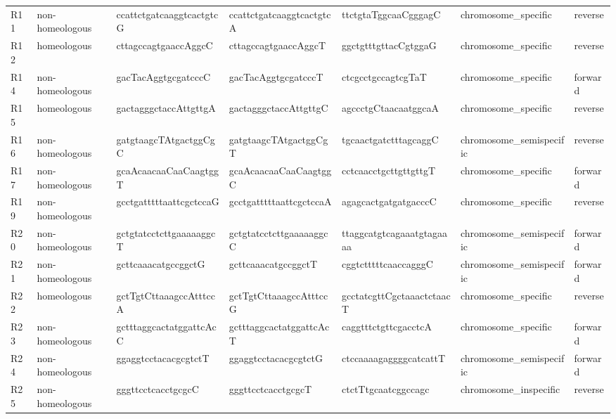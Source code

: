 \begin{sidewaystable}
\begin{localsize}{6}{9}
\begin{tabular}{lllllll}
 R11        & non-homeologous     & ccattctgatcaaggtcactgtcG    & ccattctgatcaaggtcactgtcA    & ttctgtaTggcaaCgggagC        & chromosome\_specific     & reverse       \\
 R12        & homeologous         & cttagccagtgaaccAggcC        & cttagccagtgaaccAggcT        & ggctgtttgttacCgtggaG        & chromosome\_specific     & reverse       \\
 R14        & non-homeologous     & gacTacAggtgcgatcccC         & gacTacAggtgcgatcccT         & ctcgcctgccagtcgTaT          & chromosome\_specific     & forward       \\
 R15        & homeologous         & gactagggctaccAttgttgA       & gactagggctaccAttgttgC       & agccctgCtaacaatggcaA        & chromosome\_specific     & reverse       \\
 R16        & non-homeologous     & gatgtaagcTAtgactggCgC       & gatgtaagcTAtgactggCgT       & tgcaactgatctttagcaggC       & chromosome\_semispecific & reverse       \\
 R17        & non-homeologous     & gcaAcaacaaCaaCaagtggT       & gcaAcaacaaCaaCaagtggC       & cctcaacctgcttgttgttgT       & chromosome\_specific     & forward       \\
 R19        & non-homeologous     & gcctgatttttaattcgctccaG     & gcctgatttttaattcgctccaA     & agagcactgatgatgacccC        & chromosome\_specific     & reverse       \\
 R20        & non-homeologous     & gctgtatcctcttgaaaaaggcT     & gctgtatcctcttgaaaaaggcC     & ttaggcatgtcagaaatgtagaaaa   & chromosome\_semispecific & forward       \\
 R21        & non-homeologous     & gcttcaaacatgccggctG         & gcttcaaacatgccggctT         & cggtctttttcaaccagggC        & chromosome\_semispecific & forward       \\
 R22        & homeologous         & gctTgtCttaaagccAtttccA      & gctTgtCttaaagccAtttccG      & gcctatcgttCgctaaactctaacT   & chromosome\_specific     & reverse       \\
 R23        & non-homeologous     & gctttaggcactatggattcAcC     & gctttaggcactatggattcAcT     & caggtttctgttcgacctcA        & chromosome\_specific     & forward       \\
 R24        & non-homeologous     & ggaggtcctacacgcgtctT        & ggaggtcctacacgcgtctG        & ctccaaaagaggggcatcattT      & chromosome\_semispecific & forward       \\
 R25        & non-homeologous     & gggttcctcacctgcgcC          & gggttcctcacctgcgcT          & ctctTtgcaatcggccagc         & chromosome\_inspecific   & reverse       \\

\end{tabular}
\end{localsize}
\end{sidewaystable}
